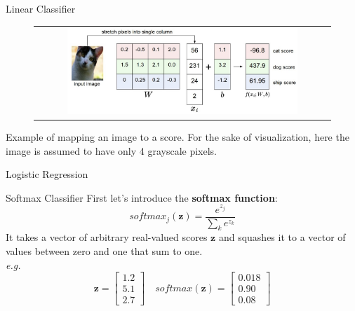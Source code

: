 \documentclass[aspectratio=169]{beamer}
\begin{document}
\begin{frame}{Linear Classifier}
\begin{figure}
\begin{tabular}{c}
\includegraphics[width=0.8\textwidth]{img/dnn/linear_classifier.jpg}
\end{tabular}
\end{figure}
\small{Example of mapping an image to a score. For the sake of visualization, here the image is assumed to have only 4 grayscale pixels.}
\end{frame}


\begin{frame}{Logistic Regression}

\end{frame}


\begin{frame}{Softmax Classifier}
First let's introduce the \textbf{softmax function}:
\begin{equation*}
softmax_j(\textbf{z}) = \frac{e^{z_j}}{\sum_k e^{z_k}}
\end{equation*}
It takes a vector of arbitrary real-valued scores $\textbf{z}$ and squashes it to a vector of values between zero and one that sum to one.\\
\emph{e.g.}
\begin{equation*}
\textbf{z} = \begin{bmatrix}1.2\\5.1\\2.7\end{bmatrix}
\quad softmax(\textbf{z}) = \begin{bmatrix}0.018\\0.90\\0.08\end{bmatrix}
\end{equation*}
\end{frame}
\end{document}
